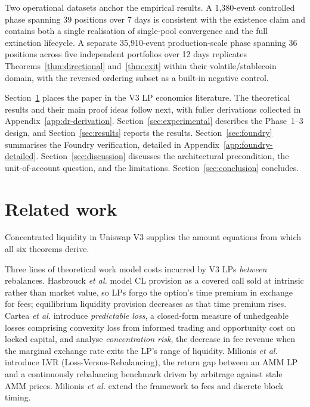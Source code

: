 \documentclass{manuscript}
\begin{document}
Two operational datasets anchor the empirical results. A 1{,}380-event controlled phase spanning 39 positions over 7 days is consistent with the existence claim and contains both a single realisation of single-pool convergence and the full extinction lifecycle. A separate 35{,}910-event production-scale phase spanning 36 positions across five independent portfolios over 12 days replicates Theorems~\ref{thm:directional} and~\ref{thm:exit} within their volatile/stablecoin domain, with the reversed ordering subset as a built-in negative control.

Section~\ref{sec:related} places the paper in the V3 LP economics literature. The theoretical results and their main proof ideas follow next, with fuller derivations collected in Appendix~\ref{app:dr-derivation}. Section~\ref{sec:experimental} describes the Phase~1--3 design, and Section~\ref{sec:results} reports the results. Section~\ref{sec:foundry} summarises the Foundry verification, detailed in Appendix~\ref{app:foundry-detailed}. Section~\ref{sec:discussion} discusses the architectural precondition, the unit-of-account question, and the limitations. Section~\ref{sec:conclusion} concludes.

\section{Related work}\label{sec:related}

Concentrated liquidity in Uniswap V3\cite{adams2021} supplies the amount equations from which all six theorems derive.

Three lines of theoretical work model costs incurred by V3 LPs \emph{between} rebalances. Hasbrouck \emph{et al.}\cite{hasbrouck2025} model CL provision as a covered call sold at intrinsic rather than market value, so LPs forgo the option's time premium in exchange for fees; equilibrium liquidity provision decreases as that time premium rises. Cartea \emph{et al.}\cite{cartea2024} introduce \emph{predictable loss}, a closed-form measure of unhedgeable losses comprising convexity loss from informed trading and opportunity cost on locked capital, and analyse \emph{concentration risk}, the decrease in fee revenue when the marginal exchange rate exits the LP's range of liquidity. Milionis \emph{et al.}\cite{milionis2022b} introduce LVR (Loss-Versus-Rebalancing), the return gap between an AMM LP and a continuously rebalancing benchmark driven by arbitrage against stale AMM prices. Milionis \emph{et al.}\cite{milionis2024} extend the framework to fees and discrete block timing.
\end{document}
